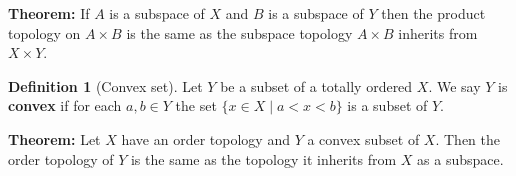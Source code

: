 \documentclass[paper=a4, fontsize=11pt]{scrartcl} %
\theoremstyle{definition}
\newtheorem*{defn}{Definition}
\numberwithin{equation}{section}    %
\numberwithin{figure}{section}      %
\numberwithin{table}{section}       %
\begin{document}
\textbf{Theorem:} If $A$ is a subspace of $X$ and $B$ is a subspace of $Y$ then
the product topology on $A \times B$ is the same as the subspace topology
$A \times B$ inherits from $X \times Y$.

\begin{defn}[Convex set]
  Let $Y$ be a subset of a totally ordered $X$. We say $Y$ is \textbf{convex}
  if for each $a, b \in Y$ the set $\{ x \in X \mid a < x < b \}$ is a subset
  of $Y$.
\end{defn}

\textbf{Theorem:} Let $X$ have an order topology and $Y$ a convex subset of $X$.
Then the order topology of $Y$ is the same as the topology it inherits from $X$
as a subspace.

\end{document}
